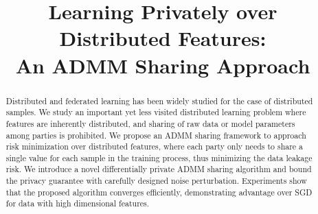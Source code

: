 \documentclass{article}
\title{Learning Privately over Distributed Features:\\An ADMM Sharing Approach}
\author{%
}
\begin{document}
\maketitle

\begin{abstract}
  Distributed and federated learning has been widely studied for the case of distributed samples.
We study an important yet less visited distributed learning problem where features are inherently distributed, and sharing of raw data or model parameters among parties is prohibited.
We propose an ADMM sharing framework to approach risk minimization over distributed features, where each party only needs to share a single value for each sample in the training process, thus minimizing the data leakage risk.
We introduce a novel differentially private ADMM sharing algorithm and bound the privacy guarantee with carefully designed noise perturbation. Experiments show that the proposed algorithm converges efficiently, demonstrating advantage over SGD for data with high dimensional features.
\end{abstract}



% 
% 







\newpage
\clearpage
\onecolumn

\end{document}
